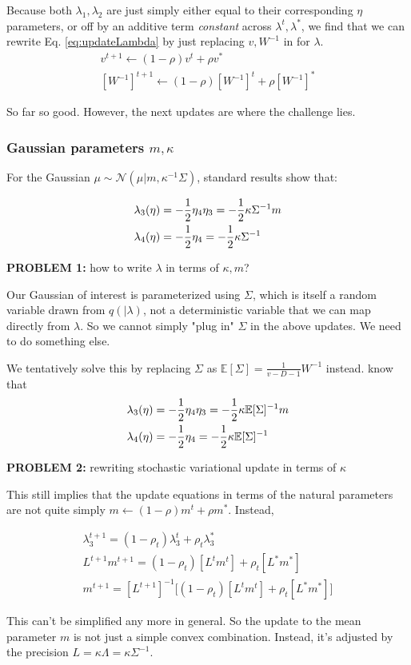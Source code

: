 \documentclass{article}
\begin{document}
Because both $\lambda_1, \lambda_2$ are just simply either equal to their corresponding $\eta$ parameters, or off by an additive term \emph{constant} across $\lambda^t,\lambda^*$,  we find that we can rewrite Eq. \ref{eq:updateLambda} by just replacing $v, W^{-1}$ in for $\lambda$.
\begin{align}
v^{t+1} \gets (1-\rho) v^{t} + \rho v^* \\
[W^{-1}]^{t+1} \gets (1-\rho) [W^{-1}]^{t} + \rho [W^{-1}]^*
\end{align}

So far so good.  However, the next updates are where the challenge lies.

\subsubsection{Gaussian parameters $m,\kappa$}

For the Gaussian $\mu \sim \mathcal{N}( \mu | m, \kappa^{-1} \Sigma)$, standard results show that:

\begin{align}
  \lambda_3(\eta) &= -\frac{1}{2}\eta_4 \eta_3 = -\frac{1}{2}\kappa \Sigma^{-1} m \notag \\
  \lambda_4(\eta) &= -\frac{1}{2}\eta_4 = -\frac{1}{2}\kappa \Sigma^{-1}
\end{align}


\textbf{PROBLEM 1:}  how to write $\lambda$ in terms of $\kappa, m$?

Our Gaussian of interest is parameterized using $\Sigma$, which is itself a random variable drawn from $q(|\lambda)$, not a deterministic variable that we can map directly from $\lambda$.  So we cannot simply "plug in" $\Sigma$ in the above updates.  We need to do something else.

We tentatively solve this by replacing $\Sigma$ as $\mathbb{E}[ \Sigma] = \frac{1}{v - D -1}W^{-1}$  instead.
know that
\begin{align}
  \lambda_3(\eta) &= -\frac{1}{2}\eta_4 \eta_3 = -\frac{1}{2}\kappa \mathbb{E}[\Sigma]^{-1} m \notag \\
  \lambda_4(\eta) &= -\frac{1}{2}\eta_4 = -\frac{1}{2}\kappa \mathbb{E}[\Sigma]^{-1}
\end{align}

\textbf{PROBLEM 2:} rewriting stochastic variational update in terms of $\kappa$

This still implies that the update equations in terms of the natural parameters are not quite simply $m\gets (1-\rho)m^t +\rho m^*$.  Instead,
 
\begin{align}
\lambda_3^{t+1} = (1-\rho_t) \lambda_3^t  + \rho_t \lambda_3^* \\
L^{t+1} m^{t+1}  =(1-\rho_t) [ L^t m^t]  + \rho_t [ L^* m^*]  \\
m^{t+1} = [L^{t+1}]^{-1} \Big[  (1-\rho_t) [ L^t m^t]  + \rho_t [ L^* m^*] \Big]
\end{align}

This can't be simplified any more in general.  So the update to the mean parameter $m$ is not just a simple convex combination.  Instead, it's adjusted by the precision $L = \kappa \Lambda = \kappa \Sigma^{-1}$.  
\end{document}
